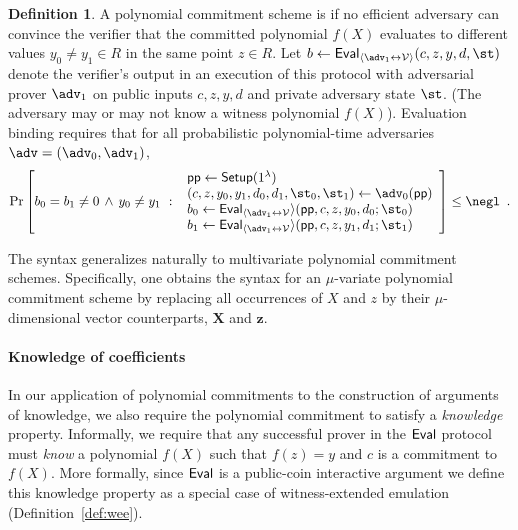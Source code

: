 \documentclass{article}
\theoremstyle{definition}
\newtheorem{definition}{Definition}
\begin{document}
\begin{definition}
A polynomial commitment scheme is  if no efficient adversary can convince the verifier that the committed polynomial $f(X)$ evaluates to different values $y_0 \neq y_1 \in R$ in the same point $z \in R$. Let $b \gets \pro{Eval}_{\langle \adv_1 \leftrightarrow \verifier\rangle}(c, z, y, d, \st)$ denote the verifier's output in an execution of this protocol with adversarial prover $\adv_1$ on public inputs $c, z, y, d$ and private adversary state $\st$. (The adversary may or may not know a witness polynomial $f(X)$). Evaluation binding requires that for all probabilistic polynomial-time adversaries $\adv = (\adv_0, \adv_1)$,
\[
    \Pr\left[
         b_0 = b_1 \neq 0 \, \wedge \, y_0 \neq y_1 \ 
         : \
       \begin{array}{l}
            \params \gets \pro{Setup}(1^\lambda) \\
            (c, z, y_0, y_1, d_0, d_1, \st_0, \st_1) \gets \adv_0(\params) \\
            b_0 \gets \pro{Eval}_{\langle \adv_1 \leftrightarrow \verifier} \rangle(\params, c, z, y_0, d_0; \st_0) \\
            b_1 \gets \pro{Eval}_{\langle \adv_1 \leftrightarrow \verifier} \rangle(\params, c, z, y_1, d_1; \st_1) \\
        \end{array}
    \right] \leq \negl \enspace .
\]
\end{definition}

The syntax generalizes naturally to multivariate polynomial commitment schemes. Specifically, one obtains the syntax for an $\mu$-variate polynomial commitment scheme by replacing all occurrences of $X$ and $z$ by their $\mu$-dimensional vector counterparts, $\mathbf{X}$ and $\mathbf{z}$.

\paragraph{Knowledge of coefficients} In our application of polynomial commitments to the construction of arguments of knowledge, we also require the polynomial commitment to satisfy a \emph{knowledge} property. Informally, we require that any successful prover in the $\textsf{{Eval}}$ protocol must \emph{know} a polynomial $f(X)$ such that $f(z) = y$ and $c$ is a commitment to $f(X)$. More formally, since $\textsf{{Eval}}$ is a public-coin interactive argument we define this knowledge property as a special case of witness-extended emulation (Definition~\ref{def:wee}). 
\end{document}
